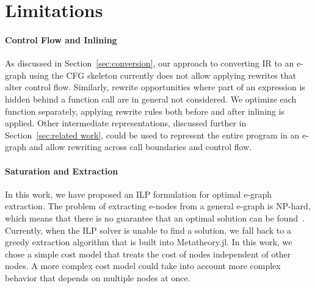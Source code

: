 
\section{Limitations}
\label{sec:limitations}
\paragraph{Control Flow and Inlining}
As discussed in Section~\ref{sec:conversion}, our approach to converting IR to an e-graph using the CFG skeleton currently does not allow applying rewrites that alter control flow.
Similarly, rewrite opportunities where part of an expression is hidden behind a function call are in general not considered.
We optimize each function separately, applying rewrite rules both before and after inlining is applied.
Other intermediate representations, discussed further in Section~\ref{sec:related work}, could be used to represent the entire program in an e-graph and allow rewriting across call boundaries and control flow.

\paragraph{Saturation and Extraction}
In this work, we have proposed an ILP formulation for optimal e-graph extraction.
The problem of extracting e-nodes from a general e-graph is NP-hard, which means that there is no guarantee that an optimal solution can be found~\cite{goharshadyFastOptimalExtraction2024}.
Currently, when the ILP solver is unable to find a solution, we fall back to a greedy extraction algorithm that is built into Metatheory.jl.
In this work, we chose a simple cost model that treats the cost of nodes independent of other nodes.
A more complex cost model could take into account more complex behavior that depends on multiple nodes at once.

